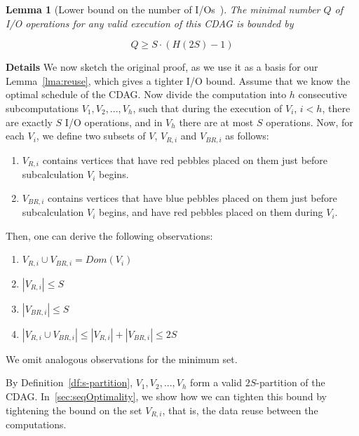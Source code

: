 \documentclass[sigplan,review,anonymous]{acmart}\settopmatter{printfolios=true,printccs=false,printacmref=false}
\newtheorem{lma}{Lemma}
\newcommand{\macb}[1]{\textbf{\textsf{#1}}}
\begin{document}
\begin{lma}[Lower bound on the number of I/Os~\cite{redblue}]
%
The minimal number $Q$ of I/O 
operations
for any valid execution of this CDAG is bounded by

\begin{equation}
\label{eq:redbluebound}
Q \ge S \cdot (H(2S) - 1)
\end{equation}
%
\end{lma}

\macb{Details}
%
We now sketch the original proof, as we use it as a basis for our 
Lemma~\ref{lma:reuse}, which gives a tighter I/O bound.
%
Assume that we know the optimal schedule of the
CDAG. Now divide the computation into $h$ consecutive subcomputations $V_1,
V_2, ..., V_h$, such that during the execution of $V_i$, $i < h$, there are
exactly $S$ I/O operations, and in $V_h$ there are at most $S$
operations. Now, for each $V_i$, we
define two subsets of $V$, $V_{R,i}$ and $V_{BR,i}$ as follows:

\begin{enumerate}[leftmargin=1.5em]
\item $V_{R,i}$ contains vertices that have red pebbles placed on them just
before subcalculation $V_i$ begins.
%
\item $V_{BR,i}$ contains vertices that have blue pebbles placed on them just
before subcalculation $V_i$ begins, and have red pebbles placed on them during
$V_i$.
%
\end{enumerate}

\noindent
Then, one can derive the following observations:

\begin{enumerate}
  \item $V_{R,i} \cup V_{BR,i} = Dom(V_i)$
  \item $|V_{R,i}| \le S$
  \item $|V_{BR,i}| \le S$
  \item $|V_{R,i} \cup V_{BR,i}| \le |V_{R,i}| + |V_{BR,i}| \le 2S$
\end{enumerate}
We omit analogous observations for the minimum set. 

By Definition~\ref{df:s-partition}, $V_1,
V_2, ..., V_h$ form %
a valid $2S$-partition of the CDAG.  In~\cref{sec:seqOptimality}, we 
show how we
can tighten this bound by tightening the bound on 
the set
$V_{R,i}$, that is, the data reuse between the computations. 
\end{document}
